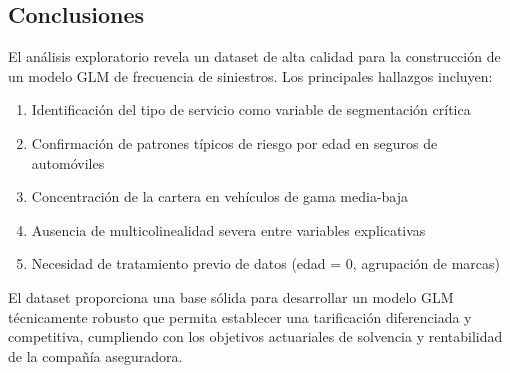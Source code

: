 \subsection{Conclusiones}

El análisis exploratorio revela un dataset de alta calidad para la construcción de un modelo GLM de frecuencia de siniestros. Los principales hallazgos incluyen:

\begin{enumerate}
\item Identificación del tipo de servicio como variable de segmentación crítica
\item Confirmación de patrones típicos de riesgo por edad en seguros de automóviles
\item Concentración de la cartera en vehículos de gama media-baja
\item Ausencia de multicolinealidad severa entre variables explicativas
\item Necesidad de tratamiento previo de datos (edad = 0, agrupación de marcas)
\end{enumerate}

El dataset proporciona una base sólida para desarrollar un modelo GLM técnicamente robusto que permita establecer una tarificación diferenciada y competitiva, cumpliendo con los objetivos actuariales de solvencia y rentabilidad de la compañía aseguradora.
